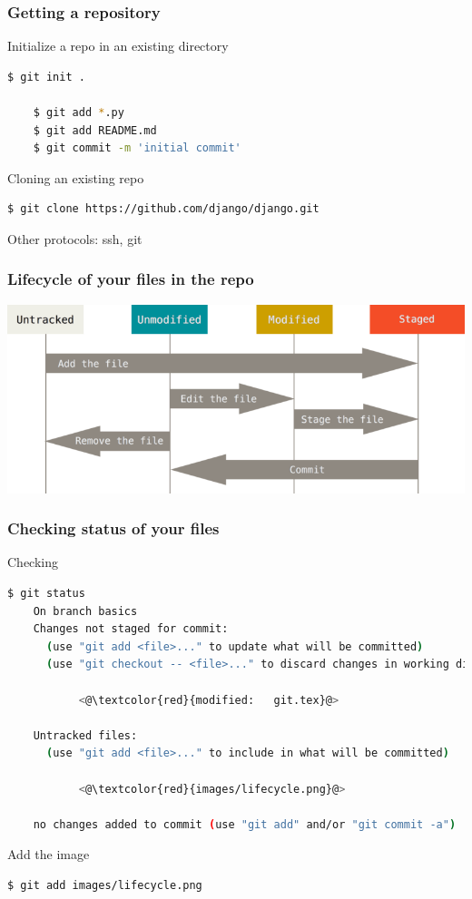 \documentclass{beamer}
\begin{document}
\begin{frame}[fragile]
  \frametitle{Getting a repository}
  Initialize a repo in an existing directory
  \begin{lstlisting}[language=bash]
    $ git init .

    $ git add *.py
    $ git add README.md
    $ git commit -m 'initial commit'
  \end{lstlisting}

  Cloning an existing repo
  \begin{lstlisting}[language=bash]
    $ git clone https://github.com/django/django.git
  \end{lstlisting}
  Other protocols: ssh, git
\end{frame}

\begin{frame}
  \frametitle{Lifecycle of your files in the repo}
  \centering
  \includegraphics[width=.9\textwidth]{lifecycle}
\end{frame}

\begin{frame}[fragile]
  \frametitle{Checking status of your files}

  Checking
  \begin{lstlisting}[language=bash,basicstyle=\ttfamily\tiny]
    $ git status
    On branch basics
    Changes not staged for commit:
      (use "git add <file>..." to update what will be committed)
      (use "git checkout -- <file>..." to discard changes in working directory)

           <@\textcolor{red}{modified:   git.tex}@>

    Untracked files:
      (use "git add <file>..." to include in what will be committed)

           <@\textcolor{red}{images/lifecycle.png}@>

    no changes added to commit (use "git add" and/or "git commit -a")
  \end{lstlisting}

  Add the image
  \begin{lstlisting}[language=bash,basicstyle=\ttfamily\tiny]
    $ git add images/lifecycle.png
  \end{lstlisting}
\end{frame}
\end{document}
